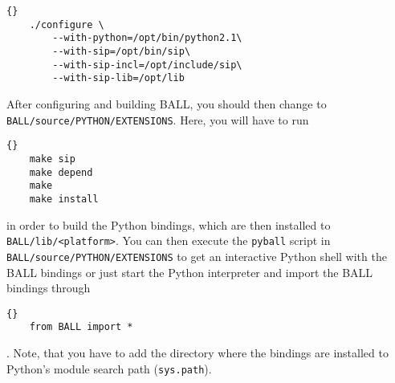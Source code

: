 \begin{lstlisting}{}
	./configure \
		--with-python=/opt/bin/python2.1\
		--with-sip=/opt/bin/sip\
		--with-sip-incl=/opt/include/sip\
		--with-sip-lib=/opt/lib
\end{lstlisting}

\noindent
After configuring and building BALL, you should then change to {\tt
BALL/source/PYTHON/EXTENSIONS}. Here, you will have to run

\begin{lstlisting}{}
	make sip
	make depend
	make
	make install
\end{lstlisting}

\noindent
in order to build the Python bindings, which are then installed to {\tt
BALL/lib/<platform>}. 
You can then execute the {\tt pyball} script in {\tt
BALL/source/PYTHON/EXTENSIONS} to get an interactive Python shell with the
BALL bindings or just start the Python interpreter and import the BALL
bindings through

\begin{lstlisting}{}
	from BALL import *
\end{lstlisting}.
\noindent
Note, that you have to add the directory where the bindings are installed to
Python's module search path ({\tt sys.path}).
